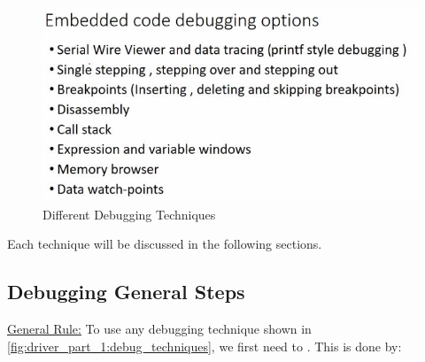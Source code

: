 \begin{figure}[h]
\centering
\includegraphics[scale=0.5]{Figures/driver_part_1/debug_techniques}
\caption{Different Debugging Techniques}
\label{fig:driver_part_1:debug_techniques}
\end{figure}

Each technique will be discussed in the following sections.

\subsection{Debugging General Steps}

\underline{General Rule:} To use any debugging technique shown in \autoref{fig:driver_part_1:debug_techniques}, we first need to . This is done by:

